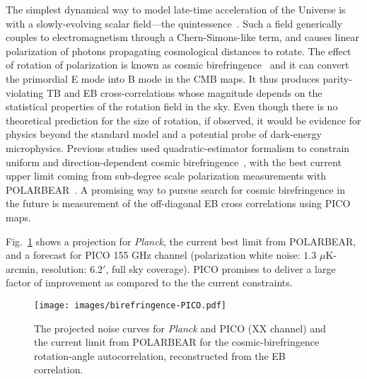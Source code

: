 The simplest dynamical way to model late-time acceleration of the Universe is with a slowly-evolving 
scalar field---the quintessence~\cite{Carroll:1998zi}. Such a field generically couples to electromagnetism through a Chern-Simons-like 
term, and causes linear polarization of photons propagating cosmological distances to rotate. 
The effect of rotation of polarization is known as cosmic birefringence~\cite{Carroll:1998zi} and it can convert the primordial E mode into B mode in 
the CMB maps. It thus produces parity-violating TB and EB cross-correlations
\cite{Kamionkowski:2008fp,Gluscevic:2009mm} whose magnitude depends on the statistical properties of the rotation field in the sky. 
Even though there is no theoretical prediction for the size of rotation, if observed, it would be evidence for physics beyond the
standard model and a potential probe of dark-energy microphysics. 
Previous studies used quadratic-estimator formalism to constrain uniform and direction-dependent cosmic birefringence~\cite{Gluscevic:2012me}, 
with the best current upper limit coming from sub-degree scale polarization measurements 
with POLARBEAR~\cite{Ade:2015cao}. 
A promising way to pursue search for cosmic birefringence in the future is measurement of the off-diagonal EB cross correlations using PICO maps.

Fig.~\ref{fig:CB-forecast} shows a projection for
\textit{Planck}, the current best limit from POLARBEAR, and a forecast for PICO 155 
GHz channel (polarization white noise: $1.3$ $\mu$K-arcmin, resolution: $6.2'$, full sky coverage).
PICO promises to deliver a large factor of improvement as compared to the the current constraints. 
\begin{figure}[h!]
\centering \texttt{[image: images/birefringence-PICO.pdf]}
\caption{The projected noise curves for \textit{Planck} and PICO (XX channel) and the current limit from POLARBEAR for the cosmic-birefringence rotation-angle autocorrelation, reconstructed from the EB correlation.}
\label{fig:CB-forecast}
\end{figure}
